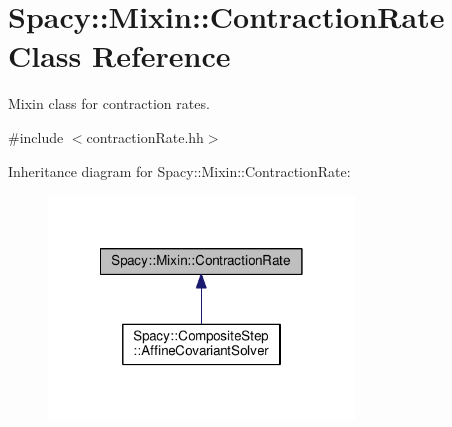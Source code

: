 \hypertarget{classSpacy_1_1Mixin_1_1ContractionRate}{\section{Spacy\-:\-:Mixin\-:\-:Contraction\-Rate Class Reference}
\label{classSpacy_1_1Mixin_1_1ContractionRate}
}


Mixin class for contraction rates.  




{\ttfamily \#include $<$contraction\-Rate.\-hh$>$}



Inheritance diagram for Spacy\-:\-:Mixin\-:\-:Contraction\-Rate\-:
\nopagebreak
\begin{figure}[H]
\begin{center}
\leavevmode
\includegraphics[width=230pt]{classSpacy_1_1Mixin_1_1ContractionRate__inherit__graph}
\end{center}
\end{figure}
